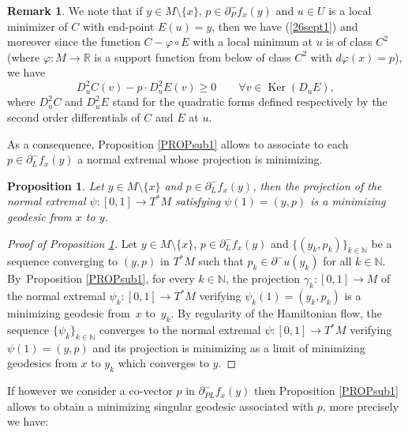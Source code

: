 \documentclass[JEP,XML,SOM,Unicode,NoFloatCountersInSection,published]{cedram}
\DeclareMathOperator{\Ker}{Ker}
\newcommand\R{\mathbb R}
\newcommand\N{\mathbb N}
\newtheorem{proposition}[theorem]{Proposition}
\theoremstyle{definition}
\newtheorem{remark}[theorem]{Remark}
\begin{document}
\begin{remark}\label{REM28oct}
We note that if $y\in M\setminus \{x\}$, $p\in \partial^-_P f_x(y)$ and $u\in U$ is a local minimizer of $C$ with end-point $E(u)=y$, then we have (\ref{26sept1}) and moreover since the function $C-\varphi\circ E$ with a local minimum at $u$ is of class $C^2$ (where $\varphi:M\to \R$ is a support function from below of class $C^2$ with $d\varphi(x)=p$), we have
\begin{equation*}
D^2_uC (v) - p\cdot D^2_uE(v) \geq 0 \qquad \forall v \in \Ker(D_uE),
\end{equation*}
where $D^2_uC$ and $D^2_uE$ stand for the quadratic forms defined respectively by the second order differentials of $C$ and $E$ at $u$.
\end{remark}

As a consequence, Proposition \ref{PROPsub1} allows to associate to each $p\in \partial^-_L f_x(y)$ a normal extremal whose projection is minimizing.

\begin{proposition}\label{PROPsub2}
Let $y\in M\setminus \{x\}$ and $p\in \partial^-_L f_x(y)$, then the projection of the normal extremal $\psi:[0,1] \to T^*M$ satisfying $\psi(1)=(y,p)$ is a minimizing geodesic from $x$ to $y$.
\end{proposition}

\begin{proof}[Proof of Proposition \ref{PROPsub2}]
Let $y\in M\setminus \{x\}$, $p\in \partial^-_L f_x(y)$ and $\{(y_k,p_k)\}_{k\in \N}$ be a sequence converging to $(y,p)$ in $T^*M$ such that $p_k\in \partial^-u(y_k)$ for all $k\in \N$. By~Proposition \ref{PROPsub1}, for every $k\in \N$, the projection $\gamma_k:[0,1] \to M$ of the normal extremal $\psi_k:[0,1] \to T^*M$ verifying $\psi_k(1)=(y_k,p_k)$ is a minimizing geodesic from~$x$ to~$y_k$. By regularity of the Hamiltonian flow, the sequence $\{\psi_k\}_{k\in \N}$ converges to the normal extremal $\psi:[0,1] \to T^*M$ verifying $\psi(1)=(y,p)$ and its projection is minimizing as a limit of minimizing geodesics from $x$ to $y_k$ which converges to $y$.
\end{proof}

If however we consider a co-vector $p$ in $\partial^-_{PL} f_x(y)$ then Proposition \ref{PROPsub1} allows to obtain a minimizing singular geodesic associated with $p$, more precisely we have:
\end{document}
